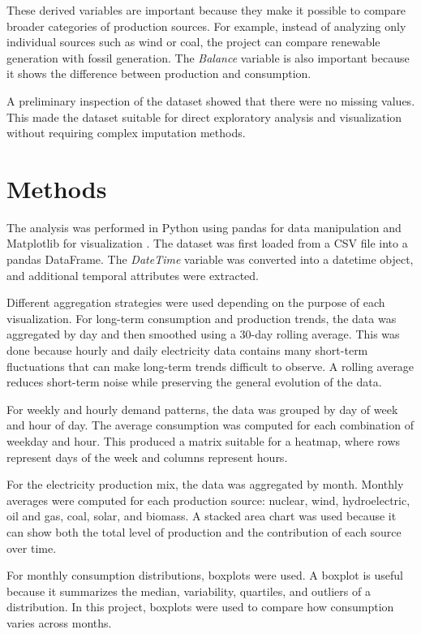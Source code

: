 \documentclass[conference]{IEEEtran}
\begin{document}
These derived variables are important because they make it possible to compare broader categories of production sources. For example, instead of analyzing only individual sources such as wind or coal, the project can compare renewable generation with fossil generation. The \textit{Balance} variable is also important because it shows the difference between production and consumption.

A preliminary inspection of the dataset showed that there were no missing values. This made the dataset suitable for direct exploratory analysis and visualization without requiring complex imputation methods.

\section{Methods}

The analysis was performed in Python using pandas for data manipulation and Matplotlib for visualization \cite{pandas,matplotlib}. The dataset was first loaded from a CSV file into a pandas DataFrame. The \textit{DateTime} variable was converted into a datetime object, and additional temporal attributes were extracted.

Different aggregation strategies were used depending on the purpose of each visualization. For long-term consumption and production trends, the data was aggregated by day and then smoothed using a 30-day rolling average. This was done because hourly and daily electricity data contains many short-term fluctuations that can make long-term trends difficult to observe. A rolling average reduces short-term noise while preserving the general evolution of the data.

For weekly and hourly demand patterns, the data was grouped by day of week and hour of day. The average consumption was computed for each combination of weekday and hour. This produced a matrix suitable for a heatmap, where rows represent days of the week and columns represent hours.

For the electricity production mix, the data was aggregated by month. Monthly averages were computed for each production source: nuclear, wind, hydroelectric, oil and gas, coal, solar, and biomass. A stacked area chart was used because it can show both the total level of production and the contribution of each source over time.

For monthly consumption distributions, boxplots were used. A boxplot is useful because it summarizes the median, variability, quartiles, and outliers of a distribution. In this project, boxplots were used to compare how consumption varies across months.
\end{document}
